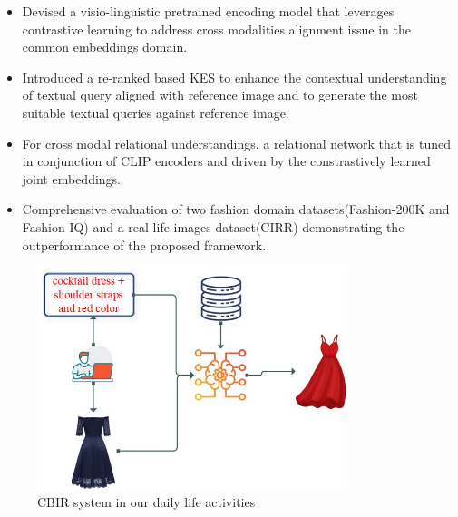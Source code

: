 \documentclass[10pt,lineno]{wlpeerj}
\begin{document}
\begin{itemize}
   \item Devised a visio-linguistic pretrained encoding model that leverages contrastive learning to address cross modalities alignment issue in the common embeddings domain.
   \item Introduced a re-ranked based KES to enhance the contextual understanding of textual query aligned with reference image and to generate the most suitable textual queries against reference image.
   \item For cross modal relational understandings, a relational network that is tuned in conjunction of CLIP encoders and driven by the constrastively learned joint embeddings.  
  \item Comprehensive evaluation of two fashion domain datasets(Fashion-200K and Fashion-IQ) and a real life images dataset(CIRR) demonstrating the outperformance of the proposed framework.
\end{itemize}

\begin{figure}[t]
    \centering
      \includegraphics[width=1\columnwidth,height=65mm]{Fig-1.jpg}
        \caption{CBIR system in our daily life activities}
    \label{fig:CBIR_Example}
\end{figure}


\end{document}
